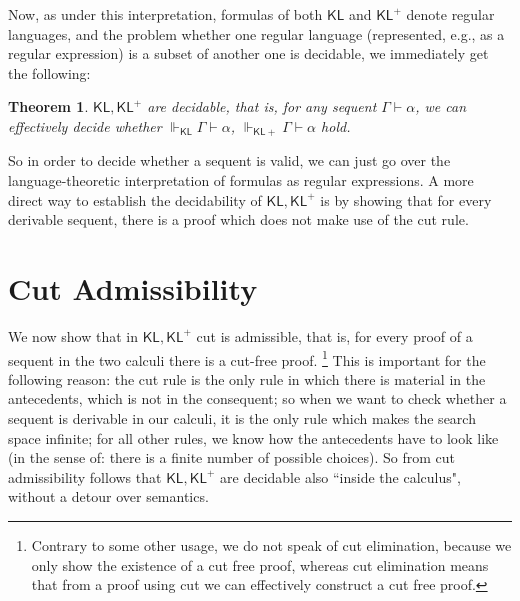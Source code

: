 \documentclass{eptcs}
\newtheorem{thm}[defn]{Theorem}
\newcommand{\KL}{\mathsf{KL}}
\begin{document}
Now, as under this interpretation, formulas of both $\KL$ and
$\KL^+$ denote regular languages, and the problem whether one
regular language (represented, e.g., as a regular expression)
is a subset of another one is decidable, we immediately get the following:

\begin{thm}
$\KL,\KL^+$ are decidable, that is, for any sequent $\Gamma\vdash\alpha$,
we can effectively decide whether $\Vdash_{\KL}\Gamma\vdash\alpha$,
$\Vdash_{\KL+}\Gamma\vdash\alpha$ hold.
\end{thm}

So in order to decide whether a sequent is valid, we can just go
over the language-theoretic interpretation of formulas as regular
expressions. A more direct way to establish the
decidability of $\KL,\KL^+$ is by showing that for every derivable
sequent, there is a proof which does not make use of the cut rule.


\section{Cut Admissibility}

We now show that in $\KL,\KL^+$ cut is admissible, 
that is, for every proof of a sequent in the two calculi
there is a  cut-free proof.
\footnote{Contrary to some other
usage, we do not speak of cut elimination, because we only show
the existence of a cut free proof, whereas cut elimination means
that from a proof using cut we can effectively construct a cut free
proof.} 
This is important for the following reason:
the cut rule is the only rule in which there is material
in the antecedents, which is not in the consequent; so when we 
want to check whether a sequent is derivable in our
calculi, it is the only rule which makes the search space infinite;
for all other rules, we know how the antecedents have
to look like (in the sense of: there is a finite number of 
possible choices). So from cut admissibility follows that $\KL,\KL^+$ are
decidable also ``inside the calculus", without a detour over
semantics. 
\end{document}
